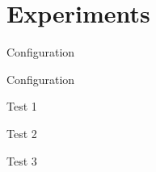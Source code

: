\documentclass{beamer}
\begin{document}
\section{Experiments}

\begin{frame}{Configuration}
\end{frame}

\begin{frame}{Configuration}
\end{frame}

\begin{frame}[fragile]{Test 1}
    \begin{figure}
        \centering
    \end{figure}
\end{frame}

\begin{frame}{Test 2}
\end{frame}

\begin{frame}{Test 3}
\end{frame}


\backmatter
\end{document}
